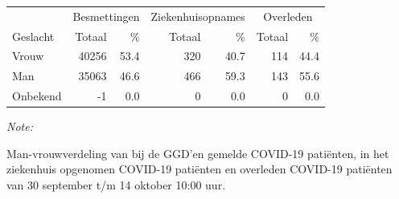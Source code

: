 \documentclass[
  english,
  man,floatsintext]{apa6}
\begin{document}
\begin{table}[H]
\centering\begingroup\fontsize{11}{13}\selectfont

\begin{threeparttable}
\begin{tabular}{lrrrrrr}
\toprule
\multicolumn{1}{c}{ } & \multicolumn{2}{c}{Besmettingen} & \multicolumn{2}{c}{Ziekenhuisopnames} & \multicolumn{2}{c}{Overleden} \\
\cmidrule(l{3pt}r{3pt}){2-3} \cmidrule(l{3pt}r{3pt}){4-5} \cmidrule(l{3pt}r{3pt}){6-7}
Geslacht & Totaal & \% & Totaal & \% & Totaal & \%\\
\midrule
Vrouw & 40256 & 53.4 & 320 & 40.7 & 114 & 44.4\\
Man & 35063 & 46.6 & 466 & 59.3 & 143 & 55.6\\
Onbekend & -1 & 0.0 & 0 & 0.0 & 0 & 0.0\\
\bottomrule
\end{tabular}
\begin{tablenotes}
\item \textit{Note: } 
\item Man-vrouwverdeling van bij de GGD’en gemelde COVID-19 patiënten, in het ziekenhuis opgenomen COVID-19 patiënten en overleden COVID-19 patiënten van 30 september t/m 14 oktober 10:00 uur.
\end{tablenotes}
\end{threeparttable}
\endgroup{}
\end{table}
\newpage
\end{document}

